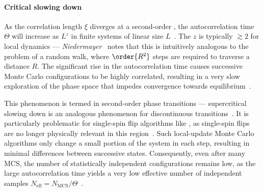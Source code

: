 \paragraph{Critical slowing down}
As the correlation length $\xi$ diverges at a second-order , the autocorrelation time $\Theta$ will increase as $L^z$ in finite systems of linear size $L$~\cite{NumericalDynamicalNiedermayer}.
The  $z$ is typically $\gtrsim 2$ for local dynamics --- \textit{Niedermayer}~\cite{niedermayer1988general} notes that this is intuitively analogous to the problem of a random walk, where $\order{R^2}$ steps are required to traverse a distance $R$.
The significant rise in the autocorrelation time causes successive Monte Carlo configurations to be highly correlated, resulting in a very slow exploration of the phase space that impedes convergence towards equilibrium~\cite{NumericalDynamicalNiedermayer,CompStatPhys,StatisticalMechanicsAlgorithmsComputations}. \par
This phenomenon is termed  in second-order phase transitions --- supercritical slowing down is an analogous phenomenon for discontinuous transitions~\cite{PhD_Reynal}.
It is particularly problematic for single-spin flip algorithms like , as single-spin flips are no longer physically relevant in this region~\cite{PhD_Reynal}.
Such local-update Monte Carlo algorithms only change a small portion of the system in each step, resulting in minimal differences between successive states.
Consequently, even after many MCS, the number of statistically independent configurations remains low, as the large autocorrelation time yields a very low effective number of independent samples $N_\mathrm{eff} = N_\mathrm{MCS}/\Theta$~\cite{niedermayer1988general,BeatCriticalSlowingDown1990}. \par

